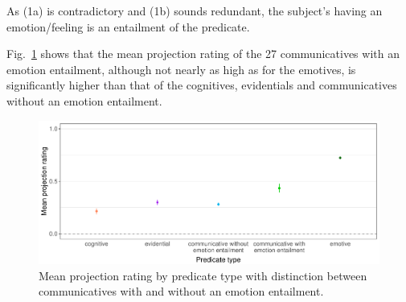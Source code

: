 \documentclass[11pt,fleqn]{article}
\newcommand{\figref}[1]{Fig.~\ref{#1}}
\newcommand{\6}{\mbox{$[\hspace*{-.6mm}[$}}
\newcommand{\9}{\mbox{$]\hspace*{-.6mm}]$}}
\begin{document}
\begin{exe}
	\ex
	\begin{xlist}
	\end{xlist}
\end{exe}
As (1a) is contradictory and (1b) sounds redundant, the subject’s having an emotion/feeling is an entailment of the predicate.

\figref{projpredtype2} shows that the mean projection rating of the 27 communicatives with an emotion entailment, although not nearly as high as for the emotives, is significantly higher than that of the cognitives, evidentials and communicatives without an emotion entailment.

\begin{figure}[H]
	\centering
	\includegraphics[width=1\textwidth]{projection-by-predicateType2}
	\caption{Mean projection rating by predicate type with distinction between communicatives with and without an emotion entailment.}
	\label{projpredtype2}
\end{figure}
\end{document}
